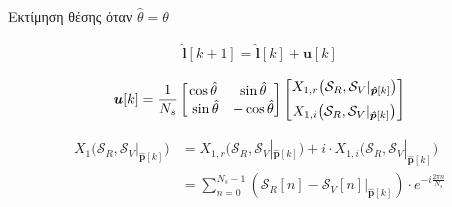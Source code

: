 \begin{frame}{Εκτίμηση θέσης όταν $\hat{\theta} = \theta$}

  \begin{align}
    \hat{\bm{l}}[k+1] = \hat{\bm{l}}[k] + \bm{u}[k] \nonumber
  \end{align}

  \begin{align}
    \bm{u}[k] = \dfrac{1}{N_s}
    \begin{bmatrix}
      \cos\hat{\theta} & \sin\hat{\theta} \\\
      \sin\hat{\theta} & - \cos\hat{\theta}
    \end{bmatrix}
    \begin{bmatrix}
      X_{1,r}\big(\mathcal{S}_R, \mathcal{S}_V|_{\bm{\hat{p}}[k]}\big) \vspace{0.2cm} \\
      X_{1,i}\big(\mathcal{S}_R, \mathcal{S}_V|_{\bm{\hat{p}}[k]}\big)
    \end{bmatrix} \nonumber
  \end{align}

  \begin{align}
    X_1\big(\mathcal{S}_R, \mathcal{S}_V|_{\bm{\hat{p}}[k]}\big) &= X_{1,r}\big(\mathcal{S}_R, \mathcal{S}_V|_{\bm{\hat{p}}[k]}\big)
      + i \cdot X_{1,i}\big(\mathcal{S}_R, \mathcal{S}_V|_{\bm{\hat{p}}[k]}\big) \nonumber \\
      &= \sum\limits_{n=0}^{N_s-1}(\mathcal{S}_R[n] - \mathcal{S}_V[n]|_{\bm{\hat{p}}[k]}) \cdot e^{-i \frac{2 \pi n}{N_s}} \nonumber
  \end{align}


\end{frame}
